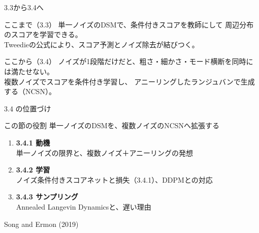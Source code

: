 ﻿%


\begin{frame}{3.3から3.4へ}
    \begin{block}{ここまで（3.3）}
        単一ノイズのDSMで、条件付きスコアを教師にして
        周辺分布のスコアを学習できる。\\
        Tweedieの公式により、スコア予測とノイズ除去が結びつく。
    \end{block}
    \begin{block}{ここから（3.4）}
        ノイズが1段階だけだと、粗さ・細かさ・モード横断を同時には満たせない。\\
        複数ノイズでスコアを条件付き学習し、
        アニーリングしたランジュバンで生成する（NCSN）。
    \end{block}
\end{frame}
\asmain
\begin{frame}{3.4 の位置づけ}
    \begin{block}{この節の役割}
        単一ノイズのDSMを、複数ノイズのNCSNへ拡張する
    \end{block}
    \begin{enumerate}
        \item \textbf{3.4.1 動機}\\
        単一ノイズの限界と、複数ノイズ＋アニーリングの発想
        \item \textbf{3.4.2 学習}\\
        ノイズ条件付きスコアネットと損失（3.4.1）、DDPMとの対応
        \item \textbf{3.4.3 サンプリング}\\
        Annealed Langevin Dynamicsと、遅い理由
    \end{enumerate}
    \vfill
    \footnotesize
    Song and Ermon (2019)
\end{frame}
